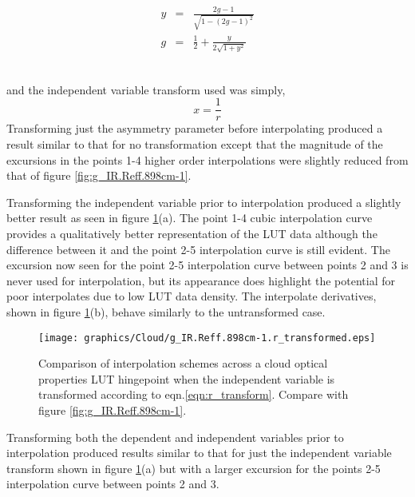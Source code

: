 \parbox{10cm}{\begin{eqnarray*}
                y & = & \frac{2g-1}{\sqrt{1-(2g-1)^{2}}}\\
                g & = & \frac{1}{2}+\frac{y}{2\sqrt{1+y^{2}}}
              \end{eqnarray*}}\hfill
\parbox{1cm}{\begin{eqnarray}\end{eqnarray}}

and the independent variable transform\cite{Purser_Variable_Transform} used was simply,
\begin{equation}
  x = \frac{1}{r}
  \label{eqn:r_transform}
\end{equation}
Transforming just the asymmetry parameter before interpolating produced a result similar to that for no transformation except that the magnitude of the excursions in the points 1-4 higher order interpolations were slightly reduced from that of figure \ref{fig:g_IR.Reff.898cm-1}.

Transforming the independent variable prior to interpolation produced a slightly better result as seen in figure \ref{fig:g_IR.Reff.898cm-1.r_transformed}(a). The point 1-4 cubic interpolation curve provides a qualitatively better representation of the LUT data although the difference between it and the point 2-5 interpolation curve is still evident. The excursion now seen for the point 2-5 interpolation curve between points 2 and 3 is never used for interpolation, but its appearance does highlight the potential for poor interpolates due to low LUT data density. The interpolate derivatives, shown in figure \ref{fig:g_IR.Reff.898cm-1.r_transformed}(b), behave similarly to the untransformed case.

\begin{figure}[htp]
  \centering
  \texttt{[image: graphics/Cloud/g\_IR.Reff.898cm-1.r\_transformed.eps]} \\
  \caption{Comparison of interpolation schemes across a cloud optical properties LUT hingepoint when the independent variable is transformed according to eqn.\ref{eqn:r_transform}. Compare with figure \ref{fig:g_IR.Reff.898cm-1}.}
  \label{fig:g_IR.Reff.898cm-1.r_transformed}
\end{figure}

Transforming both the dependent and independent variables prior to interpolation produced results similar to that for just the independent variable transform shown in figure \ref{fig:g_IR.Reff.898cm-1.r_transformed}(a) but with a larger excursion for the points 2-5 interpolation curve between points 2 and 3.

